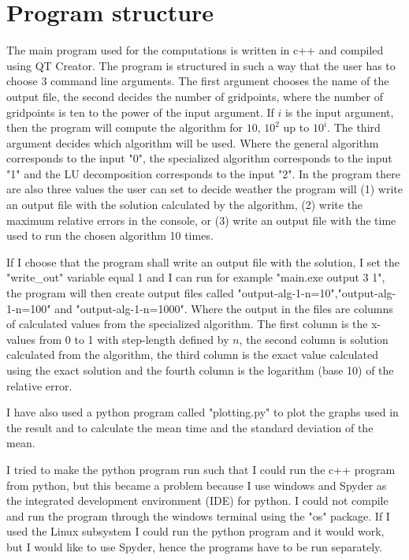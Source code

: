 \documentclass[12pt]{article}
\begin{document}
\section{Program structure}
The main program used for the computations is written in c++ and compiled using QT Creator. The program is structured in such a way that the user has to choose 3 command line arguments. The first argument chooses the name of the output file, the second decides the number of gridpoints, where the number of gridpoints is ten to the power of the input argument. If $i$ is the input argument, then the program will compute the algorithm for $10$, $10^2$ up to $10^i$. The third argument decides which algorithm will be used. Where the general algorithm corresponds to the input "0", the specialized algorithm corresponds to the input "1" and the LU decomposition corresponds to the input "2". In the program there are also three values the user can set to decide weather the program will (1) write an output file with the solution calculated by the algorithm, (2) write the maximum relative errors in the console, or (3) write an output file with the time used to run the chosen algorithm 10 times. 

If I choose that the program shall write an output file with the solution, I set the "write\_out" variable equal 1 and I can run for example "main.exe output 3 1", the program will then create output files called "output-alg-1-n=10","output-alg-1-n=100" and "output-alg-1-n=1000". Where the output in the files are columns of calculated values from the specialized algorithm. The first column is the x-values from 0 to 1 with step-length defined by $n$, the second column is solution calculated from the algorithm, the third column is the exact value calculated using the exact solution and the fourth column is the logarithm (base 10) of the relative error. 

I have also used a python program called "plotting.py" to plot the graphs used in the result and to calculate the mean time and the standard deviation of the mean.

I tried to make the python program run such that I could run the c++ program from python, but this became a problem because I use windows and Spyder as the integrated development environment (IDE) for python. I could not compile and run the program through the windows terminal using the "os" package. If I used the Linux subsystem I could run the python program and it would work, but I would like to use Spyder, hence the programs have to be run separately. 
\end{document}
